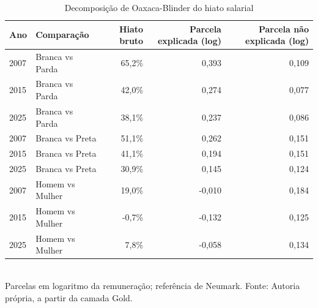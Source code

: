 \begin{table}[htbp]
    \centering
    \caption{Decomposição de Oaxaca-Blinder do hiato salarial}
    \label{tab:hiato}
    \footnotesize
    \renewcommand{\arraystretch}{1.25}
    \begin{tabular}{llrrr}
        \toprule
        \rowcolor{black!8}
        \textbf{Ano} & \textbf{Comparação} & \textbf{Hiato bruto} & \textbf{Parcela explicada (log)} & \textbf{Parcela não explicada (log)} \\
        \midrule
        2007 & Branca vs Parda & 65,2\% & 0,393 & 0,109 \\
        2015 & Branca vs Parda & 42,0\% & 0,274 & 0,077 \\
        2025 & Branca vs Parda & 38,1\% & 0,237 & 0,086 \\
        2007 & Branca vs Preta & 51,1\% & 0,262 & 0,151 \\
        2015 & Branca vs Preta & 41,1\% & 0,194 & 0,151 \\
        2025 & Branca vs Preta & 30,9\% & 0,145 & 0,124 \\
        2007 & Homem vs Mulher & 19,0\% & -0,010 & 0,184 \\
        2015 & Homem vs Mulher & -0,7\% & -0,132 & 0,125 \\
        2025 & Homem vs Mulher & 7,8\% & -0,058 & 0,134 \\
        \bottomrule
    \end{tabular}
    \\[4pt]
    Parcelas em logaritmo da remuneração; referência de Neumark. Fonte: Autoria própria, a partir da camada Gold.
\end{table}
